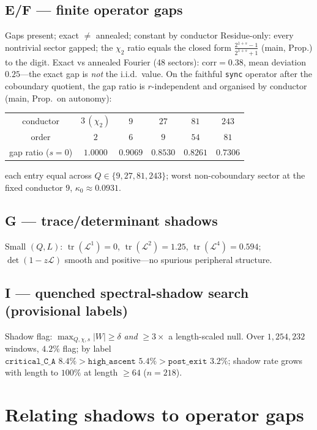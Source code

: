 \documentclass[11pt]{article}
\newcommand{\Lcal}{\mathcal{L}}
\DeclareMathOperator{\tr}{tr}
\theoremstyle{remark}
\begin{document}
\subsection*{E/F --- finite operator gaps}
\begin{findingbox}{Gaps present; exact $\ne$ annealed; constant by conductor}
Residue-only: every nontrivial sector gapped; the $\chi_2$ ratio equals the
closed form $\tfrac{2^{1+s}-1}{2^{1+s}+1}$ (main, Prop.) to the digit. Exact vs
annealed Fourier (48 sectors): $\mathrm{corr}=0.38$, mean deviation $0.25$---the
exact gap is \emph{not} the i.i.d.\ value. On the faithful \texttt{sync} operator
after the coboundary quotient, the gap ratio is $r$-independent and organised by
conductor (main, Prop.\ on autonomy):
\begin{center}
\begin{tabular}{c|ccccc}
\toprule
conductor & $3\,(\chi_2)$ & $9$ & $27$ & $81$ & $243$\\
order & $2$ & $6$ & $9$ & $54$ & $81$\\
gap ratio ($s{=}0$) & $1.0000$ & $\mathbf{0.9069}$ & $0.8530$ & $0.8261$ & $0.7306$\\
\bottomrule
\end{tabular}
\end{center}
each entry equal across $Q\in\{9,27,81,243\}$; worst non-coboundary sector at the
fixed conductor $9$, $\kappa_0\approx0.0931$.
\end{findingbox}

\subsection*{G --- trace/determinant shadows}
Small $(Q,L)$: $\tr(\Lcal^1)=0$, $\tr(\Lcal^2)=1.25$, $\tr(\Lcal^4)=0.594$;
$\det(1-z\Lcal)$ smooth and positive---no spurious peripheral structure.

\subsection*{I --- quenched spectral-shadow search (provisional labels)}
Shadow flag: $\max_{Q,\chi,s}|W|\ge\delta$ \emph{and} $\ge3\times$ a length-scaled
null. Over $1{,}254{,}232$ windows, $4.2\%$ flag; by label
$\texttt{critical\_C\_A }8.4\%>\texttt{high\_ascent }5.4\%>\texttt{post\_exit }3.2\%$;
shadow rate grows with length to $100\%$ at length $\ge64$ ($n=218$).

\section{Relating shadows to operator gaps}
\end{document}

